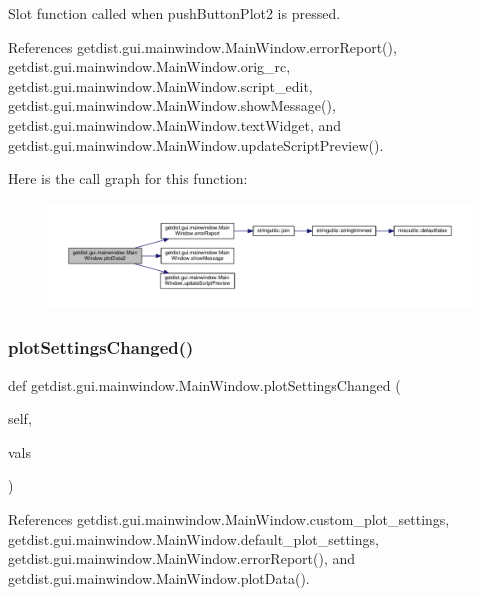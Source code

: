 \begin{DoxyVerb}Slot function called when pushButtonPlot2 is pressed.
\end{DoxyVerb}
 

References getdist.\+gui.\+mainwindow.\+Main\+Window.\+error\+Report(), getdist.\+gui.\+mainwindow.\+Main\+Window.\+orig\+\_\+rc, getdist.\+gui.\+mainwindow.\+Main\+Window.\+script\+\_\+edit, getdist.\+gui.\+mainwindow.\+Main\+Window.\+show\+Message(), getdist.\+gui.\+mainwindow.\+Main\+Window.\+text\+Widget, and getdist.\+gui.\+mainwindow.\+Main\+Window.\+update\+Script\+Preview().

Here is the call graph for this function\+:
\nopagebreak
\begin{figure}[H]
\begin{center}
\leavevmode
\includegraphics[width=350pt]{classgetdist_1_1gui_1_1mainwindow_1_1MainWindow_acf1bc04cb32ad1a78b92673311609c7c_cgraph}
\end{center}
\end{figure}
\mbox{\label{classgetdist_1_1gui_1_1mainwindow_1_1MainWindow_ab2251d26d381d446a19a21de18bcb7dd}} 
\subsubsection{\texorpdfstring{plot\+Settings\+Changed()}{plotSettingsChanged()}}
{\footnotesize\ttfamily def getdist.\+gui.\+mainwindow.\+Main\+Window.\+plot\+Settings\+Changed (\begin{DoxyParamCaption}\item[{}]{self,  }\item[{}]{vals }\end{DoxyParamCaption})}



References getdist.\+gui.\+mainwindow.\+Main\+Window.\+custom\+\_\+plot\+\_\+settings, getdist.\+gui.\+mainwindow.\+Main\+Window.\+default\+\_\+plot\+\_\+settings, getdist.\+gui.\+mainwindow.\+Main\+Window.\+error\+Report(), and getdist.\+gui.\+mainwindow.\+Main\+Window.\+plot\+Data().

